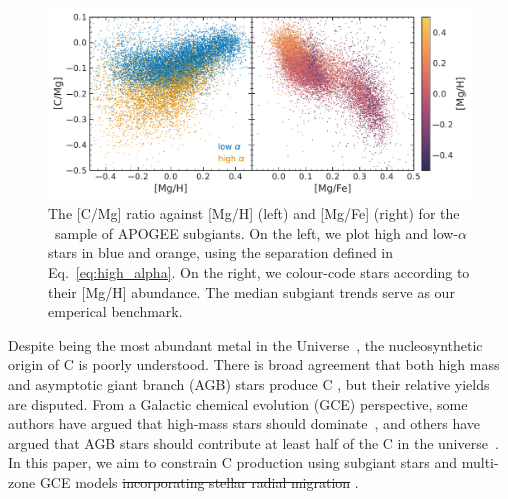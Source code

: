 \documentclass[fleqn,
usenatbib]{mnras}
\newcommand{\apogee}{APOGEE}
\newcommand{\dbstrike}[1]{{\color{Thistle} \sout{#1} }}
\newcommand{\dbadd}[1]{{\color{Thistle} #1}}
\newcommand{\dbnote}[1]{ {\color{Thistle} \textit{\small (DB: #1)}} }
\begin{document}
\begin{figure}
    \centering
    \includegraphics{subgiants.pdf}
    \caption{The [C/Mg] ratio against [Mg/H] (left) and [Mg/Fe] (right) for the \citet{jack}~sample of \apogee{} subgiants. On the left, we plot high and low-$\alpha$ stars in blue and orange, using the separation defined in Eq.~\ref{eq:high_alpha}.  On the right, we colour-code stars according to their [Mg/H] abundance. The median subgiant trends serve as our emperical benchmark. } \label{fig:subgiants}
\end{figure}



Despite being the most abundant metal in the Universe~\citep[e.g.][]{magg+22}, the nucleosynthetic origin of C is poorly understood. 
There is broad agreement that both high mass and asymptotic giant branch (AGB) stars produce C \citep{jennifer19}, but their relative yields are disputed.
From a Galactic chemical evolution (GCE) perspective, some authors have argued that high-mass stars should dominate~\citep[e.g.][]{prantzos+94, HEK00, romano+20, franchini+20, gustafsson22}, and others have argued that AGB stars should contribute at least half of the C in the universe~\citep[e.g.][]{tinsley79, chiappini+03, mattsson10, KKU11, rybizki+17, KKL20}. 
In this paper, we aim to constrain C production using subgiant stars and multi-zone GCE models \dbstrike{incorporating stellar radial migration}.

\end{document}
